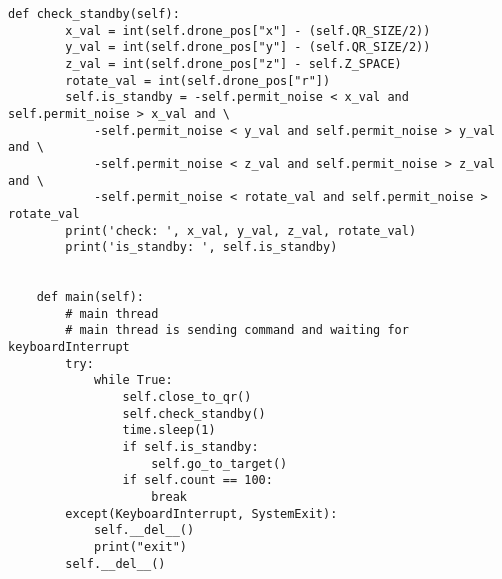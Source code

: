 \begin{lstlisting}[caption=controller.py,label=controller]
    def check_standby(self):
        x_val = int(self.drone_pos["x"] - (self.QR_SIZE/2))
        y_val = int(self.drone_pos["y"] - (self.QR_SIZE/2))
        z_val = int(self.drone_pos["z"] - self.Z_SPACE)
        rotate_val = int(self.drone_pos["r"])
        self.is_standby = -self.permit_noise < x_val and self.permit_noise > x_val and \
            -self.permit_noise < y_val and self.permit_noise > y_val and \
            -self.permit_noise < z_val and self.permit_noise > z_val and \
            -self.permit_noise < rotate_val and self.permit_noise > rotate_val
        print('check: ', x_val, y_val, z_val, rotate_val)
        print('is_standby: ', self.is_standby)


    def main(self):
        # main thread
        # main thread is sending command and waiting for keyboardInterrupt
        try:
            while True:
                self.close_to_qr()
                self.check_standby()
                time.sleep(1)
                if self.is_standby:
                    self.go_to_target()
                if self.count == 100:
                    break
        except(KeyboardInterrupt, SystemExit):
            self.__del__()
            print("exit")
        self.__del__()
\end{lstlisting}